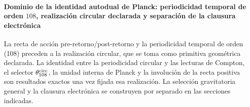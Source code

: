 \paragraph{Dominio de la identidad autodual de Planck: periodicidad temporal de orden \(108\), realización circular declarada y separación de la clausura electrónica}
La recta de acción pre-retorno/post-retorno y la periodicidad temporal de
orden (108) preceden a la realización circular, que se toma como primitiva
geométrica declarada. La identidad entre la periodicidad
circular y las lecturas de Compton, el
selector \(\theta_{108}^{\rm circ}\), la unidad interna de Planck y la
involución de la recta positiva son resultados exactos una vez fijada esa
realización. La selección gravitatoria general y la clausura electrónica
se construyen por separado en las secciones indicadas.
